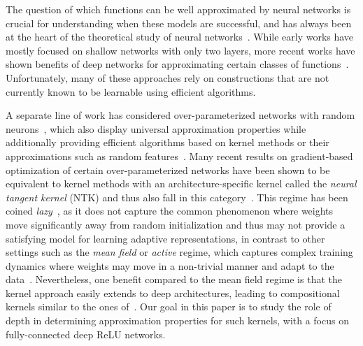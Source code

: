 
The question of which functions can be well approximated by neural networks is crucial for understanding when these models are successful, and has always been at the heart of the theoretical study of neural networks~\citep[\eg,][]{hornik1989multilayer,pinkus1999approximation}.
While early works have mostly focused on shallow networks with only two layers, more recent works have shown benefits of deep networks for approximating certain classes of functions~\citep{eldan2016power,mhaskar2016deep,telgarsky2016benefits,daniely2017depth,yarotsky2017error,schmidt2020nonparametric}.
Unfortunately, many of these approaches rely on constructions that are not currently known to be learnable using efficient algorithms.

A separate line of work has considered over-parameterized networks with random neurons~\citep{neal1996bayesian}, which also display universal approximation properties while additionally providing efficient algorithms based on kernel methods or their approximations such as random features~\citep{rahimi2007,bach2017equivalence}.
Many recent results on gradient-based optimization of certain over-parameterized networks have been shown to be equivalent to kernel methods with an architecture-specific kernel called the \emph{neural tangent kernel} (NTK) and thus also fall in this category~\citep[\eg,][]{jacot2018neural,li2018learning,allen2019convergence,du2019bgradient,du2019agradient,zou2019stochastic}.
This regime has been coined \emph{lazy}~\citep{chizat2018note}, as it does not capture the common phenomenon where weights move significantly away from random initialization and thus may not provide a satisfying model for learning adaptive representations, in contrast to other settings such as the \emph{mean field} or \emph{active} regime, which captures complex training dynamics where weights may move in a non-trivial manner and adapt to the data~\citep[\eg,][]{chizat2018global,mei2018mean}.
Nevertheless, one benefit compared to the mean field regime is that the kernel approach easily extends to deep architectures, leading to compositional kernels similar to the ones of~\citet{cho2009kernel,daniely2016toward}.
Our goal in this paper is to study the role of depth in determining approximation properties for such kernels, with a focus on fully-connected deep ReLU networks.

